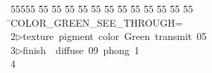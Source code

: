 %
%
\begin{tabbing}
55555 \= 55 \= 55 \= 55 \= 55 \= 55 \= 55 \= 55 \= 55 \= 55 \= 55 \= 55 \= 55 \= \>COLOR\_GREEN\_SEE\_THROUGH=\\[0pt]
2\>$\triangleright$\>texture\ pigment\ color\ Green\ transmit\ 05\ \ \\[0pt]
3\>$\triangleright$\>finish\ \ diffuse\ 09\ phong\ 1\\[0pt]
4\>\end{tabbing}
